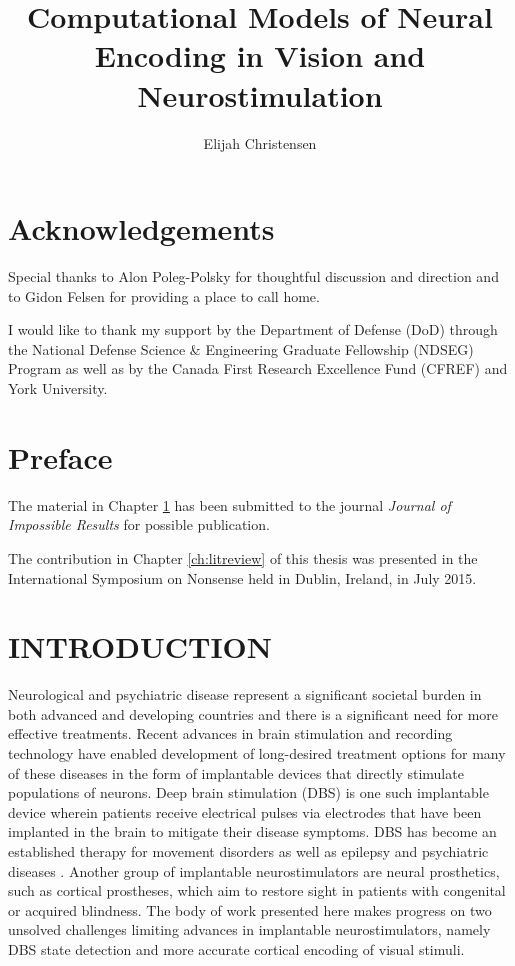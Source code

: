 \documentclass{templates/ucdenverthesis}
\author{Elijah Christensen}
\title{Computational Models of Neural Encoding in Vision and Neurostimulation}
\begin{document}

\titlepage

{\sf\tighttoc\doublespacing}

\hypertarget{acknowledgements}{%
\chapter*{Acknowledgements}\label{acknowledgements}}

Special thanks to Alon Poleg-Polsky for thoughtful discussion and direction and to Gidon Felsen for providing a place to call home.

I would like to thank my support by the Department of Defense (DoD) through the National Defense Science \& Engineering Graduate Fellowship (NDSEG) Program as well as by the Canada First Research Excellence Fund (CFREF) and York University.

\hypertarget{preface}{%
\chapter*{Preface}\label{preface}}

The material in Chapter \ref{ch:intro} has been submitted to the journal \emph{Journal of Impossible Results} for possible publication.

The contribution in Chapter \ref{ch:litreview} of this thesis was presented in the International Symposium on Nonsense held in Dublin, Ireland, in July 2015.

\clearpage{}\setcounter{page}{0}

\hypertarget{ch:intro}{%
\chapter{INTRODUCTION}\label{ch:intro}}

Neurological and psychiatric disease represent a significant societal burden in both advanced and developing countries \autocite{Collins:2011ja} and there is a significant need for more effective treatments.
Recent advances in brain stimulation and recording technology have enabled development of long-desired treatment options for many of these diseases in the form of implantable devices that directly stimulate populations of neurons.
Deep brain stimulation (DBS) is one such implantable device wherein patients receive electrical pulses via electrodes that have been implanted in the brain to mitigate their disease symptoms.
DBS has become an established therapy for movement disorders \autocite{Perlmutter:2006kp} as well as epilepsy and psychiatric diseases \autocite{Holtzheimer:2011eq}.
Another group of implantable neurostimulators are neural prosthetics, such as cortical prostheses, which aim to restore sight in patients with congenital or acquired blindness. The body of work presented here makes progress on two unsolved challenges limiting advances in implantable neurostimulators, namely DBS state detection and more accurate cortical encoding of visual stimuli.
\end{document}

